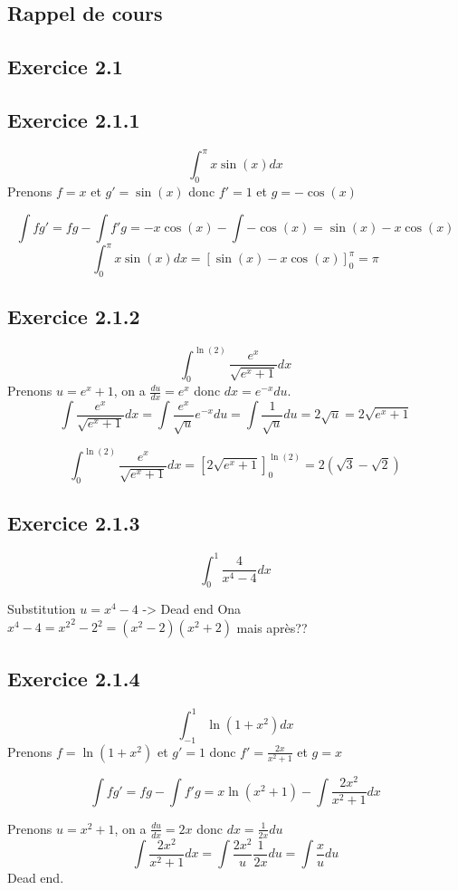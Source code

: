 \documentclass[]{book}
\theoremstyle{definition}
\begin{document}
\subsection*{Rappel de cours}

\newpage
\subsection*{Exercice 2.1}
\subsection*{Exercice 2.1.1}
$$\int_{0}^{\pi}{x\sin(x) dx}$$
Prenons $f = x$ et $g' = \sin(x)$ donc $f' = 1$ et $g = -\cos(x)$

$$\int{fg'} = fg - \int{f'g} = -x\cos(x) - \int{-\cos(x)} = \sin(x) - x\cos(x)$$
$$\int_{0}^{\pi}{x\sin(x) dx} = \left[ \sin(x) - x\cos(x) \right]_{0}^{\pi} = \pi$$

\subsection*{Exercice 2.1.2}
$$\int_{0}^{\ln(2)}{\frac{e^x}{\sqrt{e^x+1}}dx}$$
Prenons $u=e^x+1$, on a $\frac{du}{dx}=e^x$ donc $dx = e^{-x}du$.
$$\int{\frac{e^x}{\sqrt{e^x+1}}dx} = \int{\frac{e^x}{\sqrt{u}}e^{-x}du} = \int{\frac{1}{\sqrt{u}}du} = 2\sqrt{u} = 2\sqrt{e^x+1}$$

$$\int_{0}^{\ln(2)}{\frac{e^x}{\sqrt{e^x+1}}dx} = \left[ 2\sqrt{e^x+1} \right]_{0}^{\ln(2)} = 2(\sqrt{3} - \sqrt{2})$$


\subsection*{Exercice 2.1.3}
$$\int_{0}^{1}{\frac{4}{x^4-4}dx}$$

Substitution $u=x^4-4$ -> Dead end
Ona $x^4-4 = {x^2}^2 - 2^2 = (x^2-2)(x^2+2)$ mais apr\`es??


\subsection*{Exercice 2.1.4}
$$\int_{-1}^{1}{\ln(1+x^2)dx}$$
Prenons $f = \ln(1+x^2)$ et $g' = 1$ donc $f' = \frac{2x}{x^2+1}$ et $g = x$

$$\int{fg'} = fg - \int{f'g} = x\ln(x^2+1) - \int{\frac{2x^2}{x^2+1} dx}$$

Prenons $u=x^2+1$, on a $\frac{du}{dx} = 2x$ donc $dx = \frac{1}{2x}du$
$$\int{\frac{2x^2}{x^2+1} dx} = \int{\frac{2x^2}{u} \frac{1}{2x}du} = \int{\frac{x}{u}du}$$
Dead end.
\end{document}
